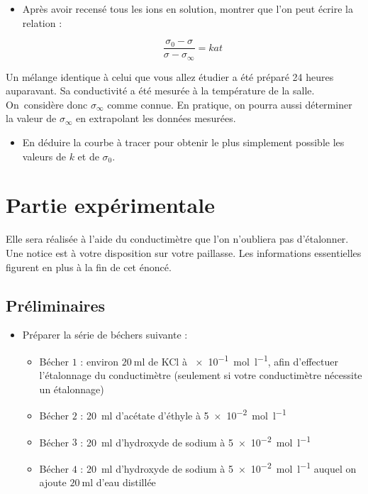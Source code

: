 \documentclass{tp}
\begin{document}
\begin{itemize}

\item Après avoir recensé tous les ions en solution, montrer que l'on peut écrire la relation : 

  \begin{equation}
  \frac{\sigma_0-\sigma}{\sigma-\sigma_{\infty}} = kat  
  \end{equation}

\end{itemize}

 Un mélange identique à celui que vous allez étudier a été préparé 24 heures auparavant. Sa conductivité a été mesurée à la température de la salle. On~considère donc $\sigma_{\infty}$ comme connue. En pratique, on pourra aussi déterminer la valeur de $\sigma_\infty$ en extrapolant les données mesurées. 

\begin{itemize}

\item En déduire la courbe à tracer pour obtenir le plus simplement possible les valeurs de $k$ et de $\sigma_0$.

\end{itemize}

\section{Partie expérimentale}

Elle sera réalisée à l'aide du conductimètre que l'on n'oubliera pas d'étalonner. Une notice est à votre disposition sur votre paillasse. Les informations essentielles figurent en plus à la fin de cet énoncé.

\subsection{Préliminaires}

\begin{itemize}
\item  Préparer la série de béchers suivante :
  \begin{itemize}
    \item	Bécher $1$ : environ $\SI{20}{\milli\litre}$ de KCl à \SI{e-1}{\mol\per\litre}, afin d'effectuer l'étalonnage du conductimètre (seulement si votre conductimètre nécessite un étalonnage)
  \item	Bécher $2$ : \SI{20}{\milli\litre} d'acétate d'éthyle à \SI{5e-2}{\mol\per\litre}
  \item	Bécher $3$ : \SI{20}{\milli\litre} d'hydroxyde de sodium à \SI{5e-2}{\mol\per\litre}
  \item	Bécher $4$ : \SI{20}{\milli\litre} d'hydroxyde de sodium à \SI{5e-2}{\mol\per\litre} auquel on ajoute $\SI{20}{\milli\litre}$ d'eau distillée
  \end{itemize}
\end{itemize}
	
\end{document}
